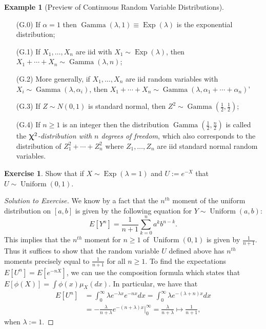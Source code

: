 \documentclass[12pt,reqno]{article}
\renewcommand{\emph}[1]{\textit{#1}}
\theoremstyle{plain}
\theoremstyle{definition}
\newtheorem{example}[theorem]{Example}
\newtheorem{exercise}[theorem]{Exercise}
\renewcommand{\chi}{\scalebox{1.25}{$\upchi$}}
\begin{document}
\begin{example}[Preview of Continuous Random Variable Distributions]
\begin{itemize}
\begin{itemize}
     \item[(G.0)] If $\alpha = 1$ then 
          $\operatorname{Gamma}(\lambda, 1) \equiv 
           \operatorname{Exp}(\lambda)$ is the exponential distribution;   
     \item[(G.1)] If $X_1,\ldots,X_n$ are iid with 
          $X_1 \sim \operatorname{Exp}(\lambda)$, then 
          $X_1+\cdots+X_n \sim \operatorname{Gamma}(\lambda, n)$; 
     \item[(G.2)] More generally, if $X_1,\ldots,X_n$ are iid random 
          variables with $X_i \sim \operatorname{Gamma}(\lambda, \alpha_i)$, 
          then 
          $X_1+\cdots+X_n \sim \operatorname{Gamma}(\lambda, \alpha_1+\cdots+\alpha_n)$' 
     \item[(G.3)] If $Z \sim N(0, 1)$ is standard normal, then 
          $Z^2 \sim \operatorname{Gamma}\left(\frac{1}{2}, \frac{1}{2}\right)$; 
     \item[(G.4)] If $n \geq 1$ is an integer then the distribution 
          $\operatorname{Gamma}\left(\frac{1}{2}, \frac{n}{2}\right)$ is called the 
          \emph{$\chi^2$-distribution with $n$ degrees of freedom}, which also 
          corresponds to the distribution of $Z_1^2+\cdots+Z_n^2$ where 
          $Z_1,\ldots,Z_n$ are iid standard normal random variables. 
     
     \end{itemize} 

\end{itemize} 
\end{example} 

\begin{exercise}
Show that if $X \sim \operatorname{Exp}(\lambda = 1)$ and 
$U := e^{-X}$ that $U \sim \operatorname{Uniform}(0, 1)$. 
\end{exercise} 
\begin{proof}[Solution to Exercise]
We know by a fact that the $n^{th}$ moment of the uniform distribution on $[a,b]$ is 
given by the following equation for $Y \sim \operatorname{Uniform}(a, b)$: 
$$E[Y^n] = \frac{1}{n+1} \sum_{k=0}^n a^k b^{n-k}.$$
This implies that the $n^{th}$ moment for $n \geq 1$ of $\operatorname{Uniform}(0, 1)$ is 
given by $\frac{1}{n+1}$. Thus it suffices to show that the random variable $U$ defined above 
has $n^{th}$ moments precisely equal to $\frac{1}{n+1}$ for all $n \geq 1$. 
To find the expectations $E[U^n] = E[e^{-nX}]$, we can use the composition formula which states 
that $E[\phi(X)] = \int \phi(x) \mu_X(dx)$. In particular, we have that 
\begin{align*} 
E[U^n] & = \int_0^{\infty} \lambda e^{-\lambda x} e^{-nx} dx = \int_0^{\infty} \lambda e^{-(\lambda+n) x} dx \\ 
     & = -\frac{\lambda}{n+\lambda} e^{-(n+\lambda)x} \Biggr\rvert_{0}^{\infty} = 
     \frac{\lambda}{n+\lambda} \longmapsto \frac{1}{n+1}, 
\end{align*} 
when $\lambda := 1$. 
\end{proof}
\end{document}
